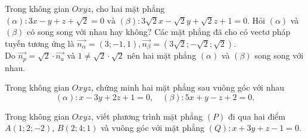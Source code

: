 \begin{vd}	%
	Trong không gian $Oxyz$, cho hai mặt phẳng		
	$(\alpha)\colon 3 x-y+z+\sqrt{2}=0 \text { và }(\beta)\colon 3 \sqrt{2} x-\sqrt{2} y+\sqrt{2} z+1=0.
	$		
	Hỏi $(\alpha)$ và  $(\beta)$ có song song với nhau hay không?
	\loigiai
	{			
		Các mặt phẳng đã cho có vectơ pháp tuyến tương ứng là $\overrightarrow{n_\alpha}=(3;-1,1), \overrightarrow{n_{\beta}}=(3\sqrt{2};-\sqrt{2};\sqrt{2})$.\\
		Do $\overrightarrow{n_p}=\sqrt{2}\cdot\overrightarrow{n_a}$ và $1\neq\sqrt{2}\cdot\sqrt{2}$ nên hai mặt phẳng $(\alpha)$ và $(\beta)$ song song với nhau.
	}
\end{vd}

\begin{vd}%
	Trong không gian $Oxyz$, chứng minh hai mặt phẳng sau vuông góc với nhau
	$$(\alpha)\colon x-3y+2z+1=0,\quad (\beta)\colon 5x+y-z+2=0.$$
\end{vd}

\begin{vd}%
	Trong không gian $Oxyz$, viết phương trình mặt phẳng $(P)$ đi qua hai điểm $A(1;2;-2)$, $B(2;4;1)$ và vuông góc với mặt phẳng $(Q)\colon x+3y+z-1=0$.
\end{vd}

